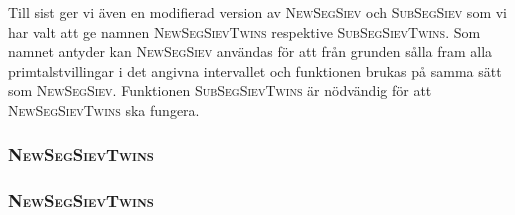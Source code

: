 Till sist ger vi även en modifierad version av \textsc{NewSegSiev} och \textsc{SubSegSiev} som vi har valt att ge namnen
\textsc{NewSegSievTwins} respektive \textsc{SubSegSievTwins}.
Som namnet antyder kan \textsc{NewSegSiev} användas för att från grunden sålla fram alla primtalstvillingar i det angivna intervallet och funktionen brukas på samma sätt som \textsc{NewSegSiev}.
Funktionen \textsc{SubSegSievTwins} är nödvändig för att \textsc{NewSegSievTwins} ska fungera.

\subsubsection*{\textsc{NewSegSievTwins}}
\subsubsection*{\textsc{NewSegSievTwins}}
